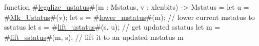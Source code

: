 function #\hyperref[sailRISCVzlegalizzezyustatus]{legalize\_ustatus}#(m : Mstatus, v : xlenbits) -> Mstatus = {
  let u = #\hyperref[sailRISCVzMkzyUstatus]{Mk\_Ustatus}#(v);
  let s = #\hyperref[sailRISCVzlowerzymstatus]{lower\_mstatus}#(m);     // lower current mstatus to sstatus
  let s = #\hyperref[sailRISCVzliftzyustatus]{lift\_ustatus}#(s, u);   // get updated sstatus
  let m = #\hyperref[sailRISCVzliftzysstatus]{lift\_sstatus}#(m, s);   // lift it to an updated mstatus
  m
}
